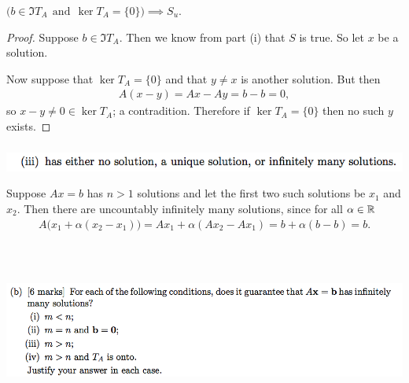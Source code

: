 \documentclass[12pt]{article}
\begin{document}
\begin{claim*}
  $\Big(b \in \Im T_A ~~\text{and}~~ \ker T_A = \{0\}\Big) \implies S_u$.
\end{claim*}

\begin{proof}
  Suppose $b \in \Im T_A$. Then we know from part (i) that $S$ is true. So let
  $x$ be a solution.

Now suppose that $\ker T_A = \{0\}$ and that $y \neq x$ is another solution. But then
\begin{align*}
  A(x - y) = Ax - Ay = b - b = 0,
\end{align*}
so $x - y \neq 0 \in \ker T_A$; a contradition. Therefore if $\ker T_A = \{0\}$
then no such $y$ exists.
\end{proof}

\subsubsection*{} %
\begin{mdframed}
\includegraphics[width=400pt]{img/oxford-prelims-2017-A-2-1-3.png}
\end{mdframed}

Suppose $Ax = b$ has $n > 1$ solutions and let the first two such solutions be
$x_1$ and $x_2$. Then there are uncountably infinitely many solutions, since
for all $\alpha \in \mathbb{R}$
\begin{align*}
A\Big(x_1 + \alpha (x_2 - x_1)\Big) = Ax_1 + \alpha(Ax_2 - Ax_1) = b + \alpha(b - b) = b.
\end{align*}

~\\
\subsection*{} %
\begin{mdframed}
\includegraphics[width=400pt]{img/oxford-prelims-2017-A-2-2.png}
\end{mdframed}
\end{document}
